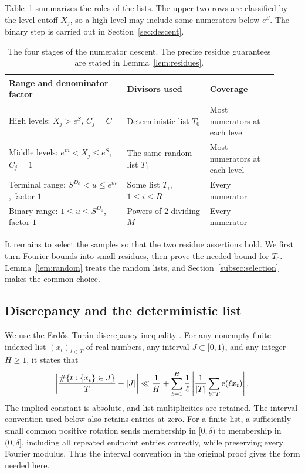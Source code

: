 Table~\ref{tab:regimes} summarizes the roles of the lists. The upper
two rows are classified by the level cutoff \(X_j\), so a high level
may include some numerators below \(e^S\). The binary step is carried
out in Section~\ref{sec:descent}.
\begin{table}[ht]
\centering
\small
\begin{tabular}{@{}p{0.40\linewidth}p{0.28\linewidth}p{0.23\linewidth}@{}}
\toprule
Range and denominator factor & Divisors used & Coverage\\
\midrule
High levels: \(X_j>e^S\), \(C_j=C\)
 & Deterministic list \(T_0\) & Most numerators at each level\\[3pt]
Middle levels: \(e^m<X_j\le e^S\), \(C_j=1\)
 & The same random list \(T_1\) & Most numerators at each level\\[3pt]
Terminal range: \(S^{D_0}<u\le e^m\), factor \(1\)
 & Some list \(T_i\), \(1\le i\le R\) & Every numerator\\[3pt]
Binary range: \(1\le u\le S^{D_0}\), factor \(1\)
 & Powers of \(2\) dividing \(M\) & Every numerator\\
\bottomrule
\end{tabular}
\caption{The four stages of the numerator descent. The precise residue
guarantees are stated in Lemma~\ref{lem:residues}.}
\label{tab:regimes}
\end{table}

It remains to select the samples so that the two residue assertions
hold.  We first turn Fourier bounds into small residues, then prove
the needed bound for \(T_0\).
Lemma~\ref{lem:random} treats the random lists, and
Section~\ref{subsec:selection} makes the common choice.

\subsection{Discrepancy and the deterministic list}

We use the Erd\H{o}s--Tur\'an discrepancy inequality
\cite[Part~I, Theorem~III]{ErdosTuran1948}.
For any nonempty finite indexed list
\((x_t)_{t\in T}\) of real numbers, any interval \(J\subset[0,1)\),
and any integer \(H\ge1\), it states that
\begin{equation}\label{eq:erdos-turan}
 \left|
 \frac{\#\{t:\{x_t\}\in J\}}{|T|}-|J|
 \right|
 \ll \frac1H+
 \sum_{\ell=1}^H\frac1\ell
 \left|\frac1{|T|}\sum_{t\in T}\mathrm e(\ell x_t)\right|.
\end{equation}
The implied constant is absolute, and list multiplicities are retained.
The interval convention used below also retains entries at zero.
For a finite list, a sufficiently small common positive rotation sends
membership in $[0,\delta)$ to membership in $(0,\delta]$, including
all repeated endpoint entries correctly, while preserving every Fourier
modulus. Thus the interval convention in the original proof
\cite[Part~II, Sections~11--16]{ErdosTuran1948} gives the form needed here.

